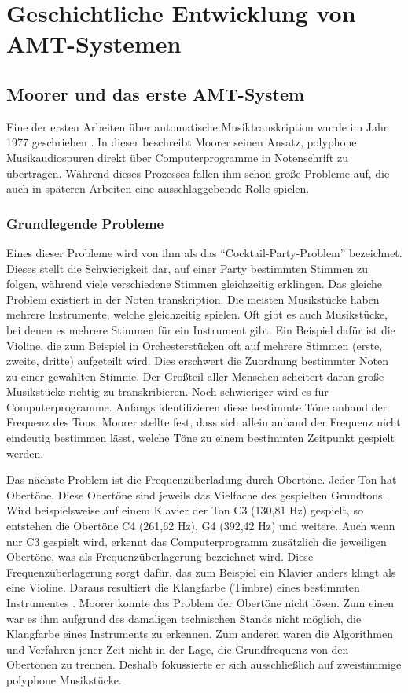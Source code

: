 \section{Geschichtliche Entwicklung von AMT-Systemen}

\subsection{Moorer und das erste AMT-System}
Eine der ersten Arbeiten über automatische Musiktranskription wurde im Jahr 1977 geschrieben \cite{Moorer1977}.
In dieser beschreibt Moorer seinen Ansatz, polyphone Musikaudiospuren
direkt über Computerprogramme in Notenschrift zu übertragen.
Während dieses Prozesses fallen ihm schon große Probleme auf, die auch in späteren Arbeiten
eine ausschlaggebende Rolle spielen.

\subsubsection{Grundlegende Probleme}
Eines dieser Probleme wird von ihm als das \enquote{Cocktail-Party-Problem} bezeichnet.
Dieses stellt die Schwierigkeit dar, auf einer Party bestimmten Stimmen zu folgen, während viele verschiedene Stimmen
gleichzeitig erklingen.
Das gleiche Problem existiert in der Noten transkription.
Die meisten Musikstücke haben mehrere Instrumente, welche gleichzeitig spielen.
Oft gibt es auch Musikstücke, bei denen es mehrere Stimmen für ein Instrument gibt.
Ein Beispiel dafür ist die Violine, die zum Beispiel in Orchesterstücken oft auf mehrere Stimmen (erste, zweite, dritte) aufgeteilt wird.
Dies erschwert die Zuordnung bestimmter Noten zu einer gewählten Stimme.
Der Großteil aller Menschen scheitert daran große Musikstücke richtig zu transkribieren.
Noch schwieriger wird es für Computerprogramme.
Anfangs identifizieren diese bestimmte Töne anhand der Frequenz des Tons.
Moorer stellte fest, dass sich allein anhand der Frequenz nicht eindeutig bestimmen lässt,
welche Töne zu einem bestimmten Zeitpunkt gespielt werden.

Das nächste Problem ist die Frequenzüberladung durch Obertöne.
Jeder Ton hat Obertöne.
Diese Obertöne sind jeweils das Vielfache des gespielten Grundtons.
Wird beispielsweise auf einem Klavier der Ton C3 (130,81 Hz) gespielt,
so entstehen die Obertöne C4 (261,62 Hz), G4 (392,42 Hz) und weitere.
Auch wenn nur C3 gespielt wird, erkennt das Computerprogramm zusätzlich die jeweiligen Obertöne,
was als Frequenzüberlagerung bezeichnet wird.
Diese Frequenzüberlagerung sorgt dafür, das zum Beispiel ein Klavier anders klingt als eine Violine.
Daraus resultiert die Klangfarbe (Timbre) eines bestimmten Instrumentes \cite{goswami2013timbre}.
Moorer konnte das Problem der Obertöne nicht lösen.
Zum einen war es ihm aufgrund des damaligen technischen Stands nicht möglich, die Klangfarbe eines Instruments zu erkennen.
Zum anderen waren die Algorithmen und Verfahren jener Zeit nicht in der Lage, die Grundfrequenz von den Obertönen zu trennen.
Deshalb fokussierte er sich ausschließlich auf zweistimmige polyphone Musikstücke.

